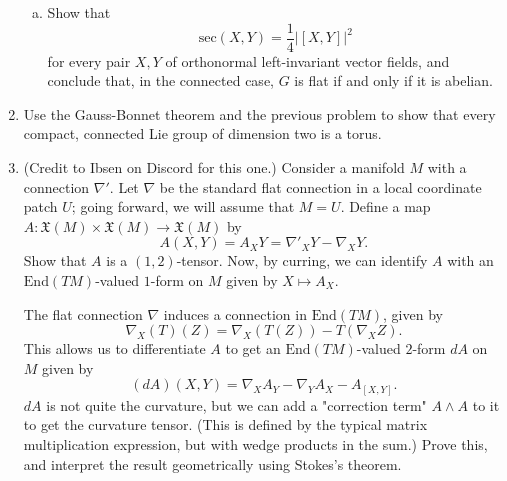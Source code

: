 \documentclass[11pt]{article} %
\begin{document}
\begin{enumerate}
\begin{enumerate}[(a)]
		\item Show that 
		\[
			\mathrm{sec}(X, Y) = \frac{1}{4}\left|[X,Y]\right|^2
		\]
		for every pair $X,Y$ of orthonormal left-invariant vector fields, and conclude that, in the connected case, $G$ is flat if and only if it is abelian.
	\end{enumerate}
	
	\item Use the Gauss-Bonnet theorem and the previous problem to show that every compact, connected Lie group of dimension two is a torus.

	\item (Credit to Ibsen on Discord for this one.) Consider a manifold $M$ with a connection $\nabla'$. Let $\nabla$ be the standard flat connection in a local coordinate patch $U$; going forward, we will assume that $M = U$. Define a map $A\colon \mathfrak{X}(M) \times \mathfrak{X}(M) \to \mathfrak{X}(M)$ by 
	\[
		A(X, Y) = A_XY = \nabla'_XY - \nabla_XY.
	\]
	Show that $A$ is a $(1, 2)$-tensor. Now, by curring, we can identify $A$ with an $\mathrm{End}(TM)$-valued $1$-form on $M$ given by $X \mapsto A_X$.

	The flat connection $\nabla$ induces a connection in $\mathrm{End}(TM)$, given by 
	\[
		\nabla_X(T)(Z) = \nabla_X(T(Z)) - T(\nabla_X Z).
	\]
	This allows us to differentiate $A$ to get an $\mathrm{End}(TM)$-valued $2$-form $dA$ on $M$ given by 
	\[
		(dA)(X, Y) = \nabla_X A_Y - \nabla_Y A_X - A_{[X, Y]}.
	\]
	$dA$ is not quite the curvature, but we can add a "correction term" $A \wedge A$ to it to get the curvature tensor. (This is defined by the typical matrix multiplication expression, but with wedge products in the sum.) Prove this, and interpret the result geometrically using Stokes's theorem.


\end{enumerate}
\end{document}
